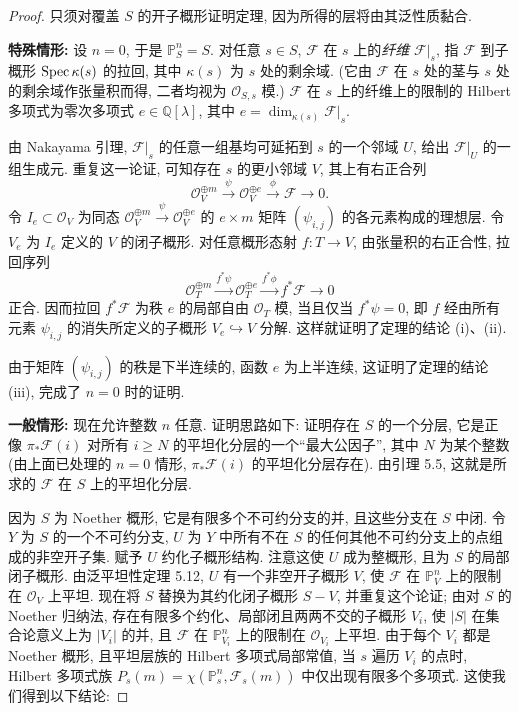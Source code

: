 \begin{proof}
只须对覆盖 $S$ 的开子概形证明定理, 因为所得的层将由其泛性质黏合.

\textbf{特殊情形:} 设 $n=0$, 于是 $\mathbb P^n_S=S$. 对任意 $s\in S$, $\mathcal F$ 在 $s$ 上的\emph{纤维} $\mathcal F|_s$, 指 $\mathcal F$ 到子概形 $\operatorname{Spec}\kappa(s)$ 的拉回, 其中 $\kappa(s)$ 为 $s$ 处的剩余域. (它由 $\mathcal F$ 在 $s$ 处的茎与 $s$ 处的剩余域作张量积而得, 二者均视为 $\mathcal O_{S,s}$ 模.) $\mathcal F$ 在 $s$ 上的纤维上的限制的 Hilbert 多项式为零次多项式 $e\in\mathbb Q[\lambda]$, 其中 $e=\dim_{\kappa(s)}\mathcal F|_s$.

由 Nakayama 引理, $\mathcal F|_s$ 的任意一组基均可延拓到 $s$ 的一个邻域 $U$, 给出 $\mathcal F|_U$ 的一组生成元. 重复这一论证, 可知存在 $s$ 的更小邻域 $V$, 其上有右正合列
\[
 \mathcal O_V^{\oplus m}\xrightarrow{\psi}\mathcal O_V^{\oplus e}
 \xrightarrow{\phi}\mathcal F\longrightarrow0.
\]
令 $I_e\subset\mathcal O_V$ 为同态 $\mathcal O_V^{\oplus m}\xrightarrow{\psi}\mathcal O_V^{\oplus e}$ 的 $e\times m$ 矩阵 $(\psi_{i,j})$ 的各元素构成的理想层. 令 $V_e$ 为 $I_e$ 定义的 $V$ 的闭子概形. 对任意概形态射 $f:T\to V$, 由张量积的右正合性, 拉回序列
\[
 \mathcal O_T^{\oplus m}\xrightarrow{f^*\psi}\mathcal O_T^{\oplus e}
 \xrightarrow{f^*\phi}f^*\mathcal F\longrightarrow0
\]
正合. 因而拉回 $f^*\mathcal F$ 为秩 $e$ 的局部自由 $\mathcal O_T$ 模, 当且仅当 $f^*\psi=0$, 即 $f$ 经由所有元素 $\psi_{i,j}$ 的消失所定义的子概形 $V_e\hookrightarrow V$ 分解.
这样就证明了定理的结论 (i)、(ii).

由于矩阵 $(\psi_{i,j})$ 的秩是下半连续的, 函数 $e$ 为上半连续, 这证明了定理的结论 (iii), 完成了 $n=0$ 时的证明.

\textbf{一般情形:} 现在允许整数 $n$ 任意. 证明思路如下: 证明存在 $S$ 的一个分层, 它是正像 $\pi_*\mathcal F(i)$ 对所有 $i\geq N$ 的平坦化分层的一个“最大公因子”, 其中 $N$ 为某个整数 (由上面已处理的 $n=0$ 情形, $\pi_*\mathcal F(i)$ 的平坦化分层存在). 由引理 5.5, 这就是所求的 $\mathcal F$ 在 $S$ 上的平坦化分层.

因为 $S$ 为 Noether 概形, 它是有限多个不可约分支的并, 且这些分支在 $S$ 中闭. 令 $Y$ 为 $S$ 的一个不可约分支, $U$ 为 $Y$ 中所有不在 $S$ 的任何其他不可约分支上的点组成的非空开子集. 赋予 $U$ 约化子概形结构. 注意这使 $U$ 成为整概形, 且为 $S$ 的局部闭子概形. 由泛平坦性定理 5.12, $U$ 有一个非空开子概形 $V$, 使 $\mathcal F$ 在 $\mathbb P^n_V$ 上的限制在 $\mathcal O_V$ 上平坦. 现在将 $S$ 替换为其约化闭子概形 $S-V$, 并重复这个论证; 由对 $S$ 的 Noether 归纳法, 存在有限多个约化、局部闭且两两不交的子概形 $V_i$, 使 $|S|$ 在集合论意义上为 $|V_i|$ 的并, 且 $\mathcal F$ 在 $\mathbb P^n_{V_i}$ 上的限制在 $\mathcal O_{V_i}$ 上平坦. 由于每个 $V_i$ 都是 Noether 概形, 且平坦层族的 Hilbert 多项式局部常值, 当 $s$ 遍历 $V_i$ 的点时, Hilbert 多项式族 $P_s(m)=\chi(\mathbb P^n_s,\mathcal F_s(m))$ 中仅出现有限多个多项式. 这使我们得到以下结论:


\end{proof}
